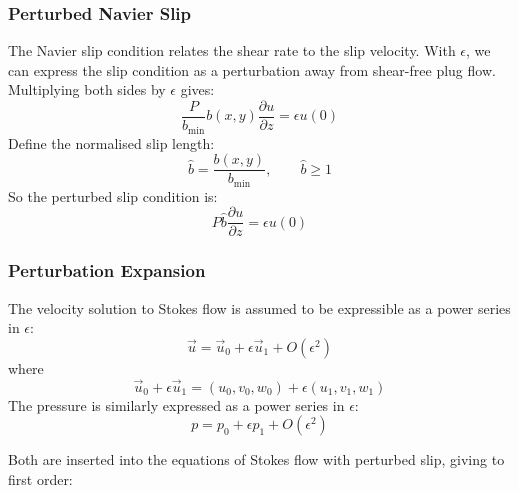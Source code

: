 \documentclass[12pt, a4paper, twoside, openright]{book}
\newcommand{\bmin}{\ensuremath{b_{\mathrm{min}}}}
\begin{document}

\clearpage



\subsubsection*{Perturbed Navier Slip}

The Navier slip condition relates the shear rate to the slip velocity.  With $\epsilon$, we can express the slip condition as a perturbation away from shear-free plug flow.  Multiplying both sides by $\epsilon$ gives:
\begin{equation}
\frac{P}{\bmin} b(x,y) \frac{\partial u }{\partial z} = \epsilon u(0)
\end{equation}
Define the normalised slip length:
\begin{equation}
\hat{b} = \frac{b(x,y)}{\bmin},   \qquad \hat{b} \geq 1
\end{equation}
So the perturbed slip condition is:
\begin{equation}
P \hat{b} \frac{\partial u}{\partial z} = \epsilon u(0)
\end{equation}


\subsubsection*{Perturbation Expansion}

The velocity solution to Stokes flow is assumed to be expressible as a power series in $\epsilon$:
\begin{equation}
\vec{u} = \vec{u}_0 + \epsilon \vec{u}_1 + O(\epsilon^2)
\end{equation}
where
\begin{equation}
\vec{u}_0 + \epsilon \vec{u}_1 = (u_0, v_0, w_0) + \epsilon(u_1, v_1, w_1)
\end{equation}
The pressure is similarly expressed as a power series in $\epsilon$:
\begin{equation}
p = p_0 + \epsilon p_1 + O(\epsilon^2)
\end{equation}

Both are inserted into the equations of Stokes flow with perturbed slip, giving to first order:
\end{document}
